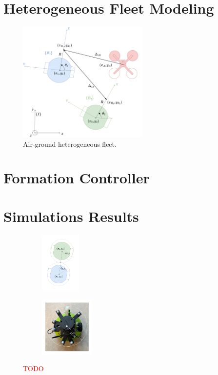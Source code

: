 \documentclass{ifacconf}
\begin{document}
\section{Heterogeneous Fleet Modeling}
\label{sec:heterogeneous_fleet_modeling}

\begin{figure}
    \centering
    \includegraphics[height=6cm]{images/heterogenous_fleet_PNG300.png}
    \caption{Air-ground heterogeneous fleet.}
    \label{fig:airground-fleet}
\end{figure}

\section{Formation Controller}
\label{sec:formation_controller}

\section{Simulations Results}
\label{sec:simulation_results}
\begin{figure}
    \centering
    \begin{subfigure}{0.3\columnwidth}
        \includegraphics[height=3cm]{images/dSafe.pdf}
    \end{subfigure}
    \hspace{-0.6cm}
    \begin{subfigure}{0.3\columnwidth}
        \includegraphics[height=3cm]{images/robot_dSafe.pdf}
    \end{subfigure}
    \caption{\textcolor{red}{TODO}}
    \label{fig:safety_distance}
\end{figure}
\end{document}
